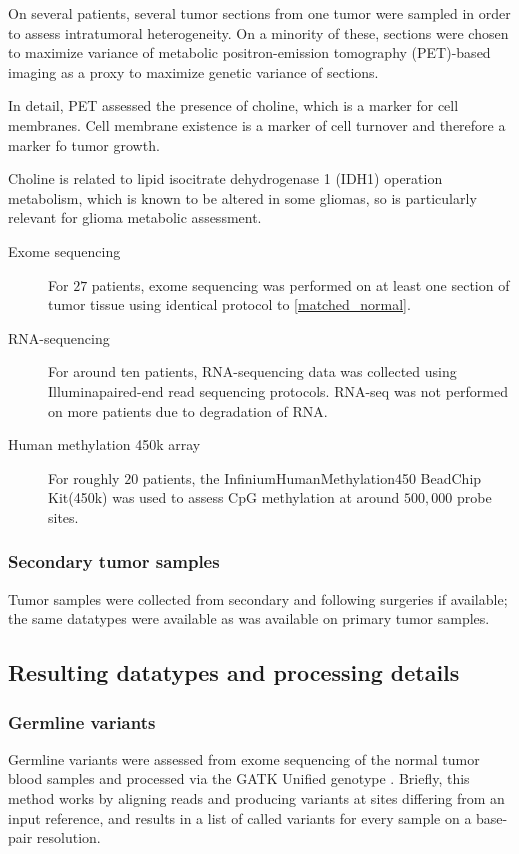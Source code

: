 On several patients, several tumor sections from one tumor were
sampled in order to assess intratumoral heterogeneity. On a minority
of these, sections were chosen to maximize variance of metabolic
positron-emission tomography (PET)-based imaging as a proxy to maximize genetic variance of sections.

In detail, PET assessed the presence of choline, which is a marker
for cell membranes. Cell membrane existence is a marker of cell
turnover and therefore a marker fo tumor growth.

Choline is related to lipid isocitrate dehydrogenase 1 (IDH1)
operation metabolism, which is known to be altered in some gliomas, so
is particularly relevant for glioma metabolic assessment. 

\begin{description}

\item[Exome sequencing] For $27$ patients, exome sequencing was
  performed on at least one section of tumor tissue using identical
  protocol to \ref{matched_normal}.

  
\item[RNA-sequencing] For around ten patients, RNA-sequencing data was
  collected using Illumina\reg paired-end read sequencing
  protocols. RNA-seq was not performed on more patients due to
  degradation of RNA.

  
\item[Human methylation 450k array] For roughly $20$ patients, the
  Infinium\reg HumanMethylation450 BeadChip Kit\tm (450k) was used to assess
  CpG methylation at around $500,000$ probe sites.
  
\end{description}


\subsubsection{Secondary tumor samples}

Tumor samples were collected from secondary and following surgeries if
available; the same datatypes were available as was available on
primary tumor samples.

\subsection{Resulting datatypes and processing details}
\subsubsection{Germline variants}
Germline variants were assessed from exome sequencing of the normal
tumor blood samples and processed via the GATK Unified genotype
\cite{mckenna_genome_2010}. Briefly, this method works by aligning reads and
producing variants at sites differing from an input reference, and
results in a list of called variants for every sample on a base-pair
resolution.


